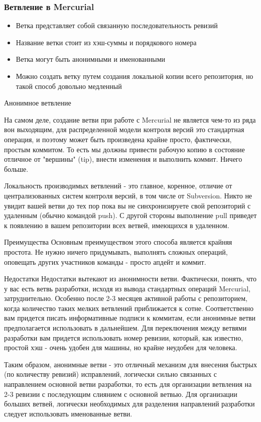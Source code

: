 \documentclass{../industrial-development}
\begin{document}
\begin{frame} \frametitle{Ветвление в Mercurial}
  \begin{itemize}
  \item Ветка представляет собой связанную последовательность ревизий
  \item Название ветки стоит из хэш-суммы и порядкового номера
  \item Ветка могут быть анонимными  и именованными
  \item Можно создать ветку путем создания локальной копии всего репозитория, но такой способ довольно медленный
  \end{itemize}
\end{frame}

\lecturenotes

Анонимное ветвление

На самом деле, создание ветви при работе с Mercurial не является чем-то из ряда вон выходящим, для распределенной модели контроля версий это стандартная операция, и поэтому может быть произведена крайне просто, фактически, простым коммитом. То есть мы должны привести рабочую копию в состояние отличное от "вершины" (tip), внести изменения и выполнить коммит. Ничего больше. 

 Локальность производимых ветвлений - это главное, коренное, отличие от централизованных систем контроля версий, в том числе от Subversion. Никто не увидит вашей ветви до тех пор пока вы не синхронизируете свой репозиторий с удаленным (обычно командой push). С другой стороны выполнение pull приведет к появлению в вашем репозитории всех ветвей, имеющихся в удаленном.

Преимущества
Основным преимуществом этого способа является крайняя простота. Не нужно ничего придумывать, выполнять сложных операций, оповещать других участников команды - просто апдейт и коммит.

Недостатки
Недостатки вытекают из анонимности ветви. Фактически, понять, что у вас есть ветвь разработки, исходя из вывода стандартных операций Mercurial, затруднительно. Особенно после 2-3 месяцев активной работы с репозиторием, когда количество таких мелких ветвлений приближается к сотне. Соответственно вам придется писать информативные подписи к коммитам, если анонимные ветви предполагается использовать в дальнейшем. Для переключения между ветвями разработки вам придется использовать номер ревизии, который, как известно, простой хэш - очень удобен для машины, но крайне неудобен для человека.

Таким образом, анонимные ветви - это отличный механизм для внесения быстрых (по количеству ревизий) исправлений, логически сильно связанных с направлением основной ветви разработки, то есть для организации ветвления на 2-3 ревизии с последующим слиянием с основной ветвью. Для организации больших ветвей, логически необходимых для разделения направлений разработки следует использовать именованные ветви.
\end{document}
